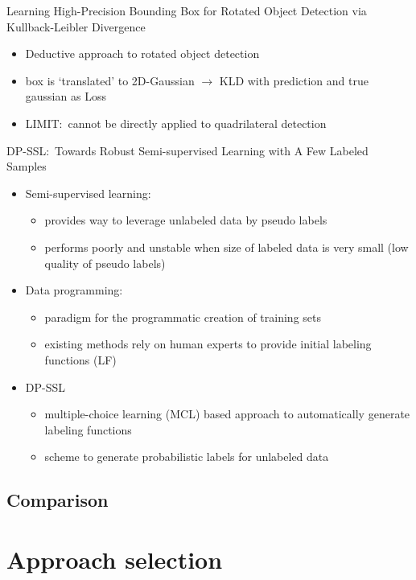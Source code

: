 Learning High-Precision Bounding Box for Rotated Object Detection via Kullback-Leibler
Divergence~\cite{yang_learning_2021}
\begin{itemize}
    \item Deductive approach to rotated object detection
    \item box is `translated' to 2D-Gaussian $\rightarrow$ KLD with prediction and true gaussian as Loss
    \item LIMIT:\ cannot be directly applied to quadrilateral detection
\end{itemize}

DP-SSL:\ Towards Robust Semi-supervised Learning with A Few Labeled Samples~\cite{xu_dp-ssl_2021}
\begin{itemize}
    \item Semi-supervised learning:
        \begin{itemize}
            \item provides way to leverage unlabeled data by pseudo labels
            \item performs poorly and unstable when size of labeled data is very small (low quality
                of pseudo labels)
        \end{itemize}
    \item Data programming:
        \begin{itemize}
            \item paradigm for the programmatic creation of training sets
            \item existing methods rely on human experts to provide initial labeling functions (LF)
        \end{itemize}
    \item DP-SSL
        \begin{itemize}
            \item multiple-choice learning (MCL) based approach to automatically generate labeling functions
            \item scheme to generate probabilistic labels for unlabeled data
        \end{itemize}
\end{itemize}



\subsection{Comparison}

\section{Approach selection}
